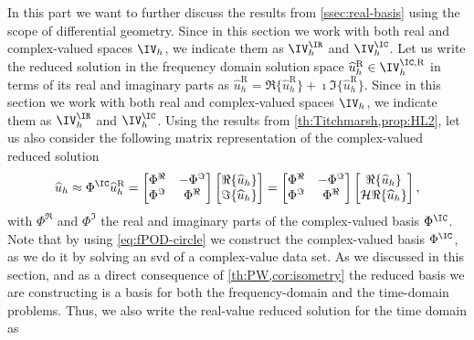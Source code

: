 In this part we want to further discuss the results from \cref{ssec:real-basis} using the scope of differential geometry.
Since in this section we work with both real and complex-valued spaces $\IV_h$, we indicate them as $\IV_h^{\IR}$ and $\IV_h^{\IC}$.
Let us write the reduced solution in the frequency domain solution space $\widehat{u}_h^{\textrm{R}} \in \IV_h^{\IC,\textrm{R}}$ in terms of its real and imaginary parts as $\widehat{u}_h^{\textrm{R}} = \Re \{ \widehat{u}_h^{\textrm{R}} \} + \imath \Im \{ \widehat{u}_h^{\textrm{R}} \}$. Since in this section we work with both real and complex-valued spaces $\IV_h$, we indicate them as $\IV_h^{\IR}$ and $\IV_h^{\IC}$. Using the results from \cref{th:Titchmarsh,prop:HL2}, let us also consider the following matrix representation of the complex-valued reduced solution
\begin{equation} \label{eq:complex-matrixform}
    \widehat{u}_h \approx \Phi^\IC \widehat{u}_h^{\textrm{R}} =
    \begin{bmatrix}
        \Phi^\Re & -\Phi^\Im \\
        \Phi^\Im & \Phi^\Re
    \end{bmatrix}
    \begin{bmatrix}
        \Re \{ \widehat{u}_h \}  \\
        \Im \{ \widehat{u}_h \}
    \end{bmatrix} =
    \begin{bmatrix}
        \Phi^\Re & -\Phi^\Im \\
        \Phi^\Im & \Phi^\Re
    \end{bmatrix}
    \begin{bmatrix}
        \Re \{ \widehat{u}_h \}  \\
        \mathcal{H} \Re \{ \widehat{u}_h \}
    \end{bmatrix},
\end{equation}
with $\Phi^\Re$ and $\Phi^\Im$ the real and imaginary parts of the complex-valued basis $\Phi^\IC$. Note that by using \cref{eq:fPOD-circle} we construct the complex-valued basis $\Phi^\IC$, as we do it by solving an \gls{svd} of a complex-value data set. As we discussed in this section, and as a direct consequence of \cref{th:PW,cor:isometry} the reduced basis we are constructing is a basis for both the frequency-domain and the time-domain problems. Thus, we also write the real-value reduced solution for the time domain as
